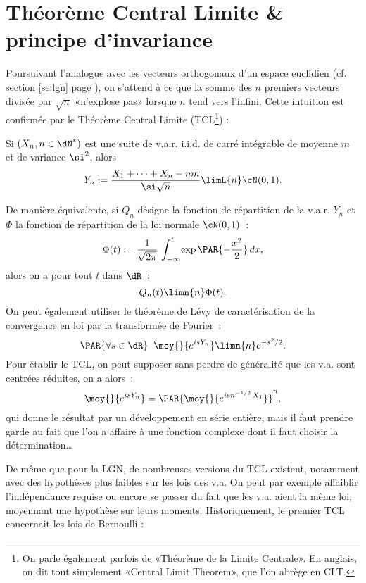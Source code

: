 %
\section{Théorème Central Limite \& principe d'invariance}\label{se:tcl}
%

Poursuivant l'analogue avec les vecteurs orthogonaux d'un espace euclidien
(cf. section \ref{se:lgn} page \pageref{se:lgn}), on s'attend à ce que la
somme des $n$ premiers vecteurs divisée par $\sqrt{n}$ «n'explose pas» lorsque
$n$ tend vers l'infini. Cette intuition est confirmée par le Théorème Central
Limite (TCL\footnote{On parle également parfois de «Théorème de la Limite
  Centrale».  En anglais, on dit tout simplement «Central Limit Theorem», que
  l'on abrège en CLT.}) :
\begin{thm}
  Si $(X_n,n\in\dN^*)$ est une suite de v.a.r. i.i.d. de carré intégrable de
  moyenne $m$ et de variance $\si^2$, alors
  $$Y_n:=\frac{X_1+\cdots+X_n-nm}{\si\sqrt{n}}\limL{n}\cN(0,1).$$
\end{thm}
De manière équivalente, si $Q_n$ désigne la fonction de répartition de la
v.a.r. $Y_n$ et $\Phi$ la fonction de répartition de la loi normale $\cN(0,1)$~:
$$
\Phi(t):=\frac{1}{\sqrt{2\pi}}\,\int_{-\infty}^t\!\exp\PAR{-\frac{x^2}{2}}\,dx,
$$
alors on a pour tout $t$ dans $\dR$~:
$$
Q_n(t)\limn{n}\Phi(t).
$$
On peut également utiliser le théorème de Lévy de caractérisation de la
convergence en loi par la transformée de Fourier~:
$$
\PAR{\forall s\in\dR}\;\; \moy{}{e^{isY_n}} \limn{n} e^{-s^2/2}.
$$
Pour établir le TCL, on peut supposer sans perdre de généralité que les
v.a. sont centrées réduites, on a alors~:
$$
\moy{}{e^{isY_n}}=\PAR{\moy{}{e^{isn^{-1/2}\,X_1}}}^n,
$$
qui donne le résultat par un développement en série entière, mais il faut
prendre garde au fait que l'on a affaire à une fonction complexe dont il faut
choisir la détermination\ldots

De même que pour la LGN, de nombreuses versions du TCL existent, notamment
avec des hypothèses plus faibles sur les lois des v.a. On peut par exemple
affaiblir l'indépendance requise ou encore se passer du fait que les v.a.
aient la même loi, moyennant une hypothèse sur leurs moments. Historiquement,
le premier TCL concernait les lois de Bernoulli :

